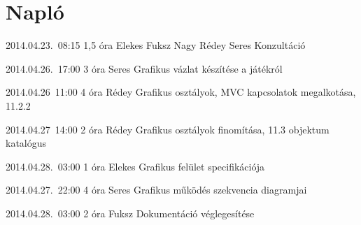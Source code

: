 %
\section{Napló}

\begin{naplo}

\bejegyzes
{2014.04.23.~08:15}
{1,5 óra}
{Elekes
Fuksz
Nagy
Rédey
Seres
}
{Konzultáció}

\bejegyzes
{2014.04.26.~17:00}
{3 óra}
{Seres}
{Grafikus vázlat készítése a játékról}

\bejegyzes
{2014.04.26~11:00}
{4 óra}
{Rédey}
{Grafikus osztályok, MVC kapcsolatok megalkotása, 11.2.2}

\bejegyzes
{2014.04.27~14:00}
{2 óra}
{Rédey}
{Grafikus osztályok finomítása, 11.3 objektum katalógus}


\bejegyzes
{2014.04.28.~03:00}
{1 óra}
{Elekes}
{Grafikus felület specifikációja}

\bejegyzes
{2014.04.27.~22:00}
{4 óra}
{Seres}
{Grafikus működés szekvencia diagramjai}

\bejegyzes
{2014.04.28.~03:00}
{2 óra}
{Fuksz}
{Dokumentáció véglegesítése}


\end{naplo}

